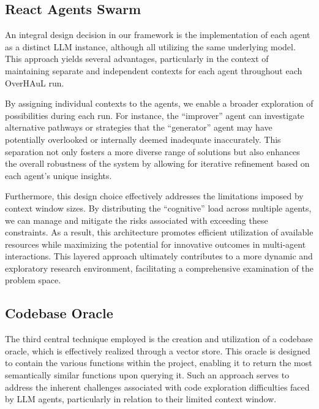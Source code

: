 \documentclass[
  a4paper,
  DIV=11,
  numbers=noendperiod]{scrreprt}
\theoremstyle{definition}
\theoremstyle{remark}
\begin{document}
\subsection{React Agents Swarm}\label{react-agents-swarm}

An integral design decision in our framework is the implementation of
each agent as a distinct LLM instance, although all utilizing the same
underlying model. This approach yields several advantages, particularly
in the context of maintaining separate and independent contexts for each
agent throughout each OverHAuL run.

By assigning individual contexts to the agents, we enable a broader
exploration of possibilities during each run. For instance, the
``improver'' agent can investigate alternative pathways or strategies
that the ``generator'' agent may have potentially overlooked or
internally deemed inadequate inaccurately. This separation not only
fosters a more diverse range of solutions but also enhances the overall
robustness of the system by allowing for iterative refinement based on
each agent's unique insights.

Furthermore, this design choice effectively addresses the limitations
imposed by context window sizes. By distributing the ``cognitive'' load
across multiple agents, we can manage and mitigate the risks associated
with exceeding these constraints. As a result, this architecture
promotes efficient utilization of available resources while maximizing
the potential for innovative outcomes in multi-agent interactions. This
layered approach ultimately contributes to a more dynamic and
exploratory research environment, facilitating a comprehensive
examination of the problem space.

\subsection{Codebase Oracle}\label{sec-oracle}

The third central technique employed is the creation and utilization of
a codebase oracle, which is effectively realized through a vector store.
This oracle is designed to contain the various functions within the
project, enabling it to return the most semantically similar functions
upon querying it. Such an approach serves to address the inherent
challenges associated with code exploration difficulties faced by LLM
agents, particularly in relation to their limited context window.
\end{document}
